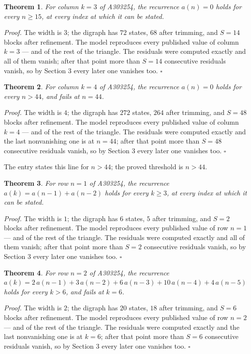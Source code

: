\documentclass[11pt]{article}
\newtheorem{theorem}{Theorem}
\theoremstyle{definition}
\begin{document}
\begin{theorem} For column $k = 3$ of A303254, the recurrence $a(n) = 0$ holds for every $n \ge 15$, at every index at which it can be stated.\end{theorem}

{\itshape Proof.} The width is $3$; the digraph has $72$ states, $68$ after trimming, and $S = 14$ blocks after refinement. The model reproduces every published value of column $k = 3$ --- and of the rest of the triangle. The residuals were computed exactly and all of them vanish; after that point more than $S = 14$ consecutive residuals vanish, so by Section 3 every later one vanishes too. $\square$

\begin{theorem} For column $k = 4$ of A303254, the recurrence $a(n) = 0$ holds for every $n > 44$, and fails at $n = 44$.\end{theorem}

{\itshape Proof.} The width is $4$; the digraph has $272$ states, $264$ after trimming, and $S = 48$ blocks after refinement. The model reproduces every published value of column $k = 4$ --- and of the rest of the triangle. The residuals were computed exactly and the last nonvanishing one is at $n = 44$; after that point more than $S = 48$ consecutive residuals vanish, so by Section 3 every later one vanishes too. $\square$

The entry states this line for $n > 44$; the proved threshold is $n > 44$.

\begin{theorem} For row $n = 1$ of A303254, the recurrence $a(k) = a(n-1) + a(n-2)$ holds for every $k \ge 3$, at every index at which it can be stated.\end{theorem}

{\itshape Proof.} The width is $1$; the digraph has $6$ states, $5$ after trimming, and $S = 2$ blocks after refinement. The model reproduces every published value of row $n = 1$ --- and of the rest of the triangle. The residuals were computed exactly and all of them vanish; after that point more than $S = 2$ consecutive residuals vanish, so by Section 3 every later one vanishes too. $\square$

\begin{theorem} For row $n = 2$ of A303254, the recurrence $a(k) = 2\,a(n-1) + 3\,a(n-2) + 6\,a(n-3) + 10\,a(n-4) + 4\,a(n-5)$ holds for every $k > 6$, and fails at $k = 6$.\end{theorem}

{\itshape Proof.} The width is $2$; the digraph has $20$ states, $18$ after trimming, and $S = 6$ blocks after refinement. The model reproduces every published value of row $n = 2$ --- and of the rest of the triangle. The residuals were computed exactly and the last nonvanishing one is at $k = 6$; after that point more than $S = 6$ consecutive residuals vanish, so by Section 3 every later one vanishes too. $\square$
\end{document}
